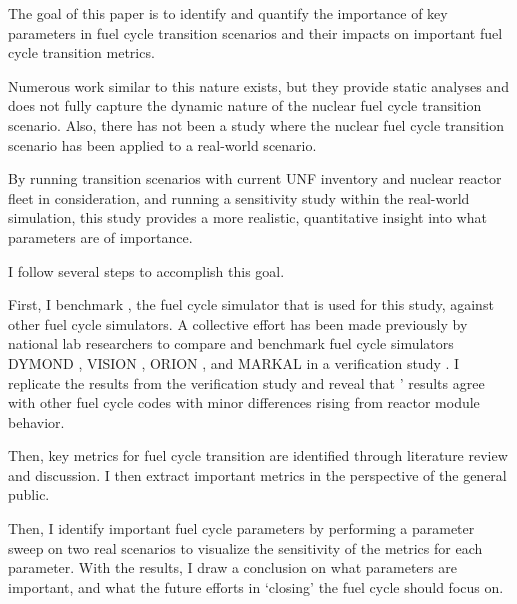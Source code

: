 The goal of this paper is to identify and quantify the
importance of key parameters in fuel cycle transition scenarios
and their impacts on important fuel cycle transition metrics.

Numerous work similar to this nature exists, but they provide
static analyses and does not fully capture the dynamic nature
of the nuclear fuel cycle transition scenario. Also, there
has not been a study where the nuclear fuel cycle transition
scenario has been applied to a real-world scenario.

By running transition scenarios with current \gls{UNF}
inventory and nuclear reactor fleet in consideration,
and running a sensitivity study within the real-world simulation,
this study provides a more realistic, quantitative insight
into what parameters are of importance.

I follow several steps to accomplish this goal.

First, I benchmark \Cyclus, the fuel cycle simulator that is used for this study,
against other fuel cycle simulators. A collective effort has been made previously
by national lab researchers to compare
and benchmark fuel cycle simulators
DYMOND \cite{yacout_modeling_2005},
VISION \cite{jacobson_verifiable_2010},
ORION \cite{gregg_analysis_2012}, and
MARKAL \cite{shay_epa_2006} in a verification study \cite{feng_standardized_2016}.
I replicate the results from the verification study and reveal that \Cyclus'
results agree with other fuel cycle codes with minor differences rising from
reactor module behavior.

Then, key metrics for fuel cycle transition
are identified through literature review and discussion. I then
extract important metrics in the perspective of the general public.

Then, I identify important fuel cycle parameters by performing a parameter
sweep on two real scenarios to visualize the sensitivity of the metrics
for each parameter. With the results, I draw a conclusion on what parameters
are important, and what the future efforts in `closing' the fuel cycle
should focus on.